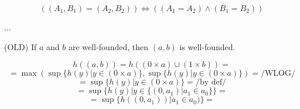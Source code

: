 \begin{theorem}
\[
((A_1,B_1) = (A_2,B_2)) \iff ((A_1=A_2)\land(B_1=B_2)) 
\]
\end{theorem}
\Proof
...\\
\Done

\begin{theorem}(OLD)
If $a$ and $b$ are well-founded, then $(a,b)$ is well-founded.
\end{theorem}
\Proof
\[
h((a,b)) = h(({0}\times a)\cup ({1}\times b)) = 
\]
\[
=\max( \sup\{h(y)|y\in ({0}\times a)\}, \sup\{h(y)|y\in ({0}\times a)\} ) = /\mbox{WLOG}/
\]
\[
= \sup\{h(y)|y\in ({0}\times a)\} = /\mbox{by def}/
\]
\[
= \sup\{h(y)|y\in \{(0,a_1)|a_1\in a_0\}\} =
\]
\[
= \sup\{h((0,a_1))|a_1\in a_0)\} =
\]

\Done
